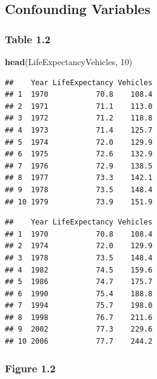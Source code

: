 \documentclass[]{book}
\newenvironment{Shaded}{\begin{snugshade}}{\end{snugshade}}
\newcommand{\DecValTok}[1]{\textcolor[rgb]{0.00,0.00,0.81}{#1}}
\newcommand{\KeywordTok}[1]{\textcolor[rgb]{0.13,0.29,0.53}{\textbf{#1}}}
\newcommand{\NormalTok}[1]{#1}
\newcommand{\OperatorTok}[1]{\textcolor[rgb]{0.81,0.36,0.00}{\textbf{#1}}}
\newcommand{\StringTok}[1]{\textcolor[rgb]{0.31,0.60,0.02}{#1}}
\begin{document}
\hypertarget{confounding-variables}{%
\subsection{Confounding Variables}\label{confounding-variables}}

\hypertarget{table-1.2}{%
\subsubsection{Table 1.2}\label{table-1.2}}

\begin{Shaded}
\begin{Highlighting}[]
\KeywordTok{head}\NormalTok{(LifeExpectancyVehicles, }\DecValTok{10}\NormalTok{)}
\end{Highlighting}
\end{Shaded}

\begin{verbatim}
##    Year LifeExpectancy Vehicles
## 1  1970           70.8    108.4
## 2  1971           71.1    113.0
## 3  1972           71.2    118.8
## 4  1973           71.4    125.7
## 5  1974           72.0    129.9
## 6  1975           72.6    132.9
## 7  1976           72.9    138.5
## 8  1977           73.3    142.1
## 9  1978           73.5    148.4
## 10 1979           73.9    151.9
\end{verbatim}

\begin{Shaded}
\end{Shaded}

\begin{verbatim}
##    Year LifeExpectancy Vehicles
## 1  1970           70.8    108.4
## 2  1974           72.0    129.9
## 3  1978           73.5    148.4
## 4  1982           74.5    159.6
## 5  1986           74.7    175.7
## 6  1990           75.4    188.8
## 7  1994           75.7    198.0
## 8  1998           76.7    211.6
## 9  2002           77.3    229.6
## 10 2006           77.7    244.2
\end{verbatim}

\hypertarget{figure-1.2}{%
\subsubsection{Figure 1.2}\label{figure-1.2}}
\end{document}
